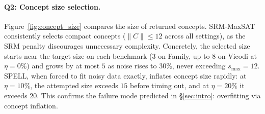 \documentclass[accepted]{uai2026} %
\theoremstyle{definition}
\theoremstyle{remark}
\begin{document}
\paragraph{Q2: Concept size selection.}
Figure~\ref{fig:concept_size} compares the size
of returned concepts. SRM-MaxSAT consistently selects compact
concepts ($\|C\| \leq 12$ across all settings), as the SRM
penalty discourages unnecessary complexity.
Concretely, the selected size starts near
the target size on each benchmark ($3$ on Family, up to $8$ on
Vicodi at $\eta = 0\%$) and grows by at most $5$ as noise rises
to $30\%$, never exceeding $s_{\max} = 12$.
SPELL, when forced
to fit noisy data exactly, inflates concept size rapidly: at
$\eta = 10\%$, the attempted size exceeds $15$ before timing
out, and at $\eta = 20\%$ it exceeds $20$.
This confirms the failure mode predicted in
\S\ref{sec:intro}: overfitting via concept inflation.
\end{document}
